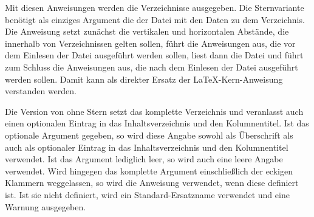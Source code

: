 \begin{Declaration}
\end{Declaration}
Mit diesen Anweisungen werden die Verzeichnisse
ausgegeben. Die Sternvariante 
benötigt als einziges Argument die  der Datei mit den
Daten zu dem Verzeichnis. Die Anweisung setzt zunächst die vertikalen und
horizontalen Abstände, die innerhalb von Verzeichnissen gelten sollen, führt
die Anweisungen aus, die vor dem Einlesen der Datei ausgeführt werden sollen,
liest dann die Datei und führt zum Schluss die Anweisungen aus, die nach dem
Einlesen der Datei ausgeführt werden sollen. Damit kann  als
direkter Ersatz der \LaTeX-Kern-Anweisung
 verstanden
werden.

Die Version von  ohne Stern
setzt das komplette Verzeichnis und veranlasst auch einen optionalen Eintrag
in das Inhaltsverzeichnis und den Kolumnentitel. Ist das optionale Argument
 gegeben, so wird diese Angabe sowohl als Überschrift als
auch als optionaler Eintrag in das Inhaltsverzeichnis und den Kolumnentitel
verwendet. Ist das Argument  lediglich leer, so wird auch eine
leere Angabe verwendet. Wird hingegen das komplette
Argument einschließlich der eckigen Klammern weggelassen, so wird die
Anweisung  verwendet, wenn diese
definiert ist. Ist sie nicht definiert, wird ein Standard-Ersatzname verwendet
und eine Warnung ausgegeben.

